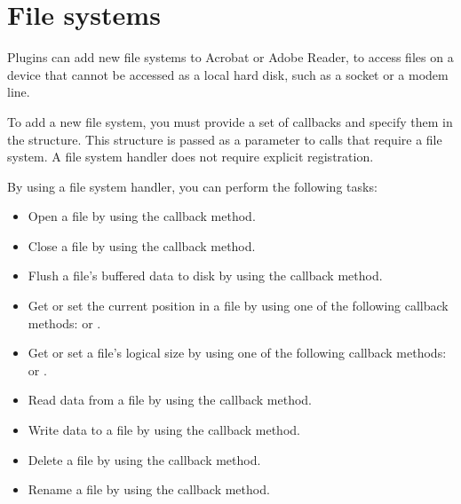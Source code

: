 \documentclass[letterpaper,12pt,english,openany,oneside]{sphinxmanual}
\begin{document}
\section{File systems}
\label{\detokenize{Plugins_Handlers:file-systems}}
Plugins can add new file systems to Acrobat or Adobe Reader, to access files on a device that cannot be accessed as a local hard disk, such as a socket or a modem line.

To add a new file system, you must provide a set of callbacks and specify them in the  structure. This structure is passed as a parameter to calls that require a file system. A file system handler does not require explicit registration.

By using a file system handler, you can perform the following tasks:
\begin{itemize}
\item {} 
Open a file by using the  callback method.

\item {} 
Close a file by using the  callback method.

\item {} 
Flush a file’s buffered data to disk by using the  callback method.

\item {} 
Get or set the current position in a file by using one of the following callback methods:  or .

\item {} 
Get or set a file’s logical size by using one of the following callback methods:  or .

\item {} 
Read data from a file by using the  callback method.

\item {} 
Write data to a file by using the  callback method.

\item {} 
Delete a file by using the  callback method.

\item {} 
Rename a file by using the  callback method.


\end{itemize}
\end{document}
